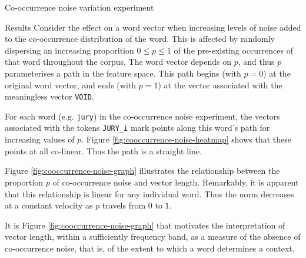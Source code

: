 \documentclass{article} %
\newcommand{\word}[1]{\texttt{#1}}
\begin{document}
\begin{section}{Co-occurrence noise variation experiment}
\begin{subsection}{Results}
Consider the effect on a word vector when increasing levels of noise added to the co-occurrence distribution of the word.
This is affected by randomly dispersing an increasing proporition $0 \leqslant p \leqslant 1$ of the pre-existing occurrences of that word throughout the corpus.
The word vector depends on $p$, and thus $p$ parameterises a path in the feature space.
This path begins (with $p=0$) at the original word vector, and ends (with $p=1$) at the vector associated with the meaningless vector \word{VOID}.

For each word (e.g. \word{jury}) in the co-occurrence noise experiment, the vectors associated with the tokens \word{JURY\_i} mark points along this word's path for increasing values of $p$.
Figure \ref{fig:cooccurrence-noise-heatmap} shows that these points at all co-linear.
Thus the path is a straight line.

Figure \ref{fig:cooccurrence-noise-graph} illustrates the relationship between the proportion $p$ of co-occurrence noise and vector length.
Remarkably, it is apparent that this relationship is linear for any individual word.
Thus the norm decreases at a constant velocity as $p$ travels from $0$ to $1$.

It is Figure \ref{fig:cooccurrence-noise-graph} that motivates the interpretation of vector length, within a sufficiently frequency band, as a measure of the absence of co-occurrence noise, that is, of the extent to which a word determines a context.


\end{subsection}
\end{section}
\end{document}
